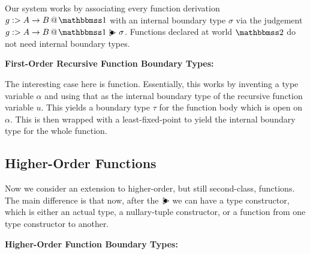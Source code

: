 \documentclass[]{article}
\begin{document}
\begin{abstrsyn}
Our system works by associating every function derivation \mbox{$\colfun g {A \to B} \bbone$} with an internal boundary type $\sigma$
via the judgement $\ibtj g {A \to B} \sigma$.  
Functions declared at world $\bbtwo$ do not need internal boundary types.

\begin{framed}
\noindent\textbf{First-Order Recursive Function Boundary Types:}
\end{framed}

The interesting case here is function. 
Essentially, this works by inventing a type variable $\alpha$ and using that as the internal boundary type of the recursive function variable $u$.
This yields a boundary type $\tau$ for the function body which is open on $\alpha$.
This is then wrapped with a least-fixed-point to yield the internal boundary type for the whole function.

\subsection {Higher-Order Functions}

Now we consider an extension to higher-order, but still second-class, functions.
The main difference is that now, after the $\ibtsym$ we can have a type constructor, 
which is either an actual type, a nullary-tuple constructor, or a function from one type constructor to another.

\begin{framed}
\noindent\textbf{Higher-Order Function Boundary Types:}
\end{framed}


\end{abstrsyn}
\end{document}

